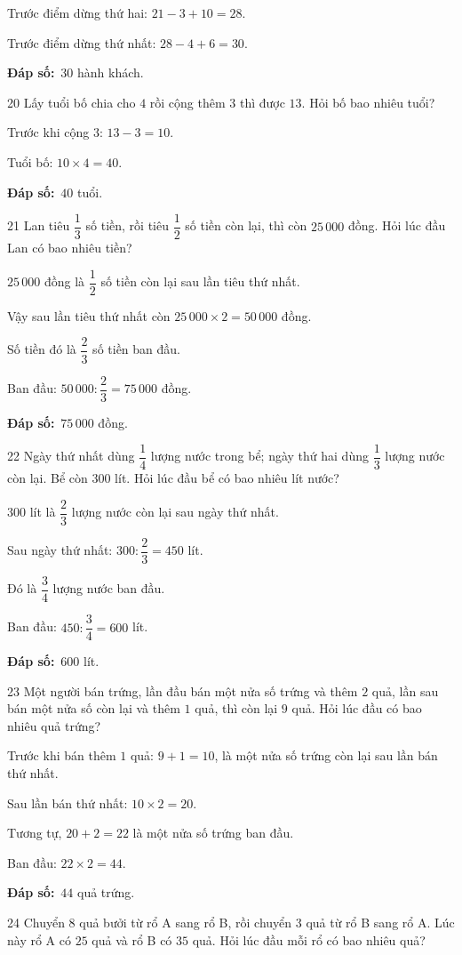 \documentclass[11pt]{article}
\newif\ifsol \solfalse
\providecommand{\AnsWord}{Đáp số}
\newcommand{\dapso}[1]{\par\textbf{\AnsWord:}\ #1}
\newcommand{\probsol}[1]{%
  \begin{lrbox}{\solmeasure}\begin{minipage}{\dimexpr\linewidth-24pt\relax}#1\end{minipage}\end{lrbox}%
  \ifsol
    \begin{solbox}#1\end{solbox}%
  \else
    \setlength{\solht}{\dimexpr\ht\solmeasure+\dp\solmeasure+0.85cm\relax}%
    \ifdim\solht<1.35cm\setlength{\solht}{1.35cm}\fi
    \begin{tcolorbox}[colback=white,colframe=Line,boxrule=0.8pt,arc=5pt,
      left=8pt,right=8pt,top=4pt,bottom=4pt,height=\solht]{\footnotesize\color{Slate}\itshape\WorkWord}\end{tcolorbox}%
  \fi}
\newcommand{\gap}{\vspace{0.3cm}}
\def\WorkWord{Bài làm:}
\def\AnsWord{Đáp số}
\begin{document}
\probsol{
Trước điểm dừng thứ hai: $21-3+10=28$.\par Trước điểm dừng thứ nhất: $28-4+6=30$.
\dapso{$30$ hành khách.}}
\gap
\begin{probbox}{20}{\relax}
Lấy tuổi bố chia cho $4$ rồi cộng thêm $3$ thì được $13$. Hỏi bố bao nhiêu tuổi?
\end{probbox}
\probsol{
Trước khi cộng $3$: $13-3=10$.\par Tuổi bố: $10\times4=40$.
\dapso{$40$ tuổi.}}
\gap
\begin{probbox}{21}{\relax}
Lan tiêu $\dfrac13$ số tiền, rồi tiêu $\dfrac12$ số tiền còn lại, thì còn $25\,000$ đồng. Hỏi lúc đầu Lan có bao nhiêu tiền?
\end{probbox}
\probsol{
$25\,000$ đồng là $\dfrac12$ số tiền còn lại sau lần tiêu thứ nhất.\par Vậy sau lần tiêu thứ nhất còn $25\,000\times2=50\,000$ đồng.\par Số tiền đó là $\dfrac23$ số tiền ban đầu.\par Ban đầu: $50\,000:\dfrac23=75\,000$ đồng.
\dapso{$75\,000$ đồng.}}
\gap
\begin{probbox}{22}{\relax}
Ngày thứ nhất dùng $\dfrac14$ lượng nước trong bể; ngày thứ hai dùng $\dfrac13$ lượng nước còn lại. Bể còn $300$ lít. Hỏi lúc đầu bể có bao nhiêu lít nước?
\end{probbox}
\probsol{
$300$ lít là $\dfrac23$ lượng nước còn lại sau ngày thứ nhất.\par Sau ngày thứ nhất: $300:\dfrac23=450$ lít.\par Đó là $\dfrac34$ lượng nước ban đầu.\par Ban đầu: $450:\dfrac34=600$ lít.
\dapso{$600$ lít.}}
\gap
\begin{probbox}{23}{\relax}
Một người bán trứng, lần đầu bán một nửa số trứng và thêm $2$ quả, lần sau bán một nửa số còn lại và thêm $1$ quả, thì còn lại $9$ quả. Hỏi lúc đầu có bao nhiêu quả trứng?
\end{probbox}
\probsol{
Trước khi bán thêm $1$ quả: $9+1=10$, là một nửa số trứng còn lại sau lần bán thứ nhất.\par Sau lần bán thứ nhất: $10\times2=20$.\par Tương tự, $20+2=22$ là một nửa số trứng ban đầu.\par Ban đầu: $22\times2=44$.
\dapso{$44$ quả trứng.}}
\gap
\begin{probbox}{24}{\relax}
Chuyển $8$ quả bưởi từ rổ A sang rổ B, rồi chuyển $3$ quả từ rổ B sang rổ A. Lúc này rổ A có $25$ quả và rổ B có $35$ quả. Hỏi lúc đầu mỗi rổ có bao nhiêu quả?
\end{probbox}
\end{document}
